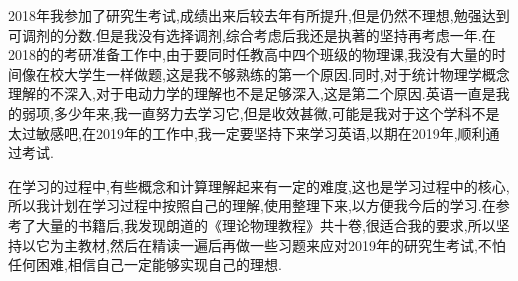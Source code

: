2018年我参加了研究生考试,成绩出来后较去年有所提升,但是仍然不理想,勉强达到可调剂的分数.但是我没有选择调剂,综合考虑后我还是执著的坚持再考虑一年.在2018的的考研准备工作中,由于要同时任教高中四个班级的物理课,我没有大量的时间像在校大学生一样做题,这是我不够熟练的第一个原因.同时,对于统计物理学概念理解的不深入,对于电动力学的理解也不是足够深入,这是第二个原因.英语一直是我的弱项,多少年来,我一直努力去学习它,但是收效甚微,可能是我对于这个学科不是太过敏感吧,在2019年的工作中,我一定要坚持下来学习英语,以期在2019年,顺利通过考试.

在学习的过程中,有些概念和计算理解起来有一定的难度,这也是学习过程中的核心,所以我计划在学习过程中按照自己的理解,使用\LaTeXe{}整理下来,以方便我今后的学习.在参考了大量的书籍后,我发现朗道的《理论物理教程》共十卷,很适合我的要求,所以坚持以它为主教材,然后在精读一遍后再做一些习题来应对2019年的研究生考试,不怕任何困难,相信自己一定能够实现自己的理想.
